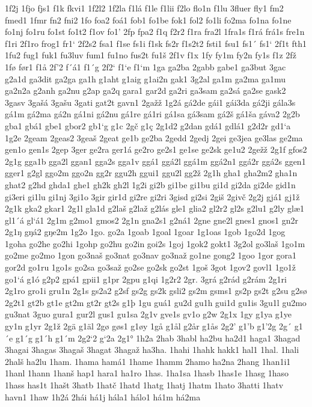 1f2j
1fjo
fjs1
f1k
fkvi1
1f2l2
1f2la
f1lá
f1le
f1lii
f2lo
flo1n
f1lu
3fluer
fly1
fm2
fmed1
1fmr
fn2
fni2
1fo
foa2
foá1
fob1
fo1be
fok1
fol2
fo1li
fo2ma
fo1na
fo1ne
fo1nj
fo1ru
fo1st
fo1t2
f1ov
fo1'
2fp
fpa2
f1q
f2r2
f1ra
fra2l
1fra1s
f1rá
frá1s
fre1n
f1ri
2f1ro
frog1
fr1`
2f2s2
fsa1
f1se
fs1i
f1sk
fs2r
f1s2t2
fsti1
fsu1
fs1´
fs1`
2f1t
fth1
1fu2
fug1
fuk1
fu3luv
fum1
fu1no
fus2t
fu1š
2f1v
f1x
1fy
fy1m
fy2n
fy1s
f1z
2fž
1fø
før1
f1å
2f'2
f´á1
f1´g
2f2`
f1`e
f1`m
1ga
ga2ba
2gabb
gabe1
ga3but
3gac
g2a1d
ga3dit
ga2ga
ga1h
g1aht
g1aig
g1ai2n
gak1
3g2al
ga1m
ga2ma
ga1mu
ga2n2a
g2anh
ga2nu
g2ap
ga2q
gara1
gar2d
ga2ri
ga3sam
ga2sá
ga2se
gask2
3gasv
3gašá
3gašu
3gati
gat2t
gavn1
2gažž
1g2á
gá2de
gái1
gái3da
gá2ji
gála3s
gá1m
gá2ma
gá2n
gá1ni
gá2nu
gá1re
gá1ri
gá1sa
gá3sam
gá2š
gá1ša
gáva2
2g2b
gba1
gbá1
gbe1
gbor2
gb1`g
g1c
2gč
g1ç
2g1d2
g2dan
gdá1
gdlá1
g2d2r
gd1`a
1g2e
2geam
2geas2
3geaš
2geat
ge1b
ge2ba
2gedd
2gedj
2gei
ge3jea
ge3las
ge2ma
gen1o
gen1s
2gep
3ger
ge2ra
ger1á
ge2ro
ge2s1
ge1se
ge2sk
ge1u2
2gežž
2g1f
gfos2
2g1g
gga1b
gga2l
ggan1
gga2s
gga1v
ggá1
ggá2l
ggá1m
ggá2n1
ggá2r
ggá2s
ggen1
gger1
g2gl
ggo2m
ggo2n
gg2r
ggu2h
ggui1
ggu2l
gg2ž
2g1h
gha1
gha2m2
gha1n
ghat2
g2hd
ghda1
ghe1
gh2k
gh2l
1g2i
gi2b
gi1be
gi1bu
gi1d
gi2da
gi2de
gid1n
gi3eri
gi1lu
gi1nj
3gi1o
3gir
gir1d
gi2re
gi2ri
3gisd
gi2si
2giš
2givč
2g2j
gjá1
gj1ž
2g1k
gka2
gkar1
2g1l
gla1d
g2laš
g2laž
g2lás
gle1
glia2
gl2r2
gl2s
g2lu1
g2ly
glæ1
gl1´á
gl`á1
2g1m
g2mo1
gmos2
2g1n
gna2s1
g2ná1
2gne
gne2l
gnes1
gnos1
gn2r
2g1ŋ
gŋá2
gŋe2m
1g2o
1go.
go2a
1goab
1goal
1goar
1g1oas
1gob
1go2d
1gog
1goha
go2he
go2hi
1gohp
go2hu
go2in
goi2s
1goj
1gok2
gokt1
3g2ol
go3laš
1go1m
go2me
go2mo
1gon
go3naš
go3nat
go3nav
go3naž
go1ne
gong2
1goo
1gor
gora1
gor2d
go1ru
1go1s
go2sa
go3saž
go2se
go2sk
go2st
1goš
3got
1gov2
govl1
1go1ž
go1`á
g1ó
g2p2
gpá1
gpii1
g1pr
2gpu
g1qi
1g2r2
2gr.
3grá
g2rád
g2rám
2g1ri
2g1ro
gro1i
gru1n
2g1s
gs2a2
g2sf
gs2g
gs2k
gsli2
gs2m
gsms1
gs2p
gs2t
g2su
g2sø
2g2t1
gt2b
gt1e
gt2m
gt2r
gt2s
g1þ
1gu
guá1
gu2d
gu1h
gui1d
gu1is
3gu1l
gu2mo
gu3nat
3guo
gura1
gur2l
gus1
gu1sa
2g1v
gve1s
gv1o
g2w
2g1x
1gy
g1ya
g1ye
gy1n
g1yr
2g1ž
2gä
g1äl
2gø
gøs1
g1øy
1gå
g1ål
g2år
g1ås
2g2'
g1'b
g1'2g
2g´
g1´e
g1´g
g1´h
g1´m
2g2`2
g`2a
2g1°
1h2a
2hab
3habl
ha2bu
ha2d1
haga1
3hagad
3hagai
3hagas
3hagaš
3hagat
3hagaž
ha3ha.
1hahi
1hahk
hakk1
hal1
1hal.
1hali
2halš
ha2lu
1ham.
1hama
hamá1
1hame
1hamm
2hamo
ha2na
2hang
1han1i1
1hanl
1hann
1hanš
hap1
hara1
ha1ro
1has.
1ha1sa
1hasb
1has1e
1hasg
1haso
1hass
has1t
1hašt
3hatb
1hatč
1hatd
1hatg
1hatj
1hatm
1hato
3hatti
1hatv
havn1
1haw
1h2á
2hái
há1j
hála1
hálo1
há1m
há2ma
